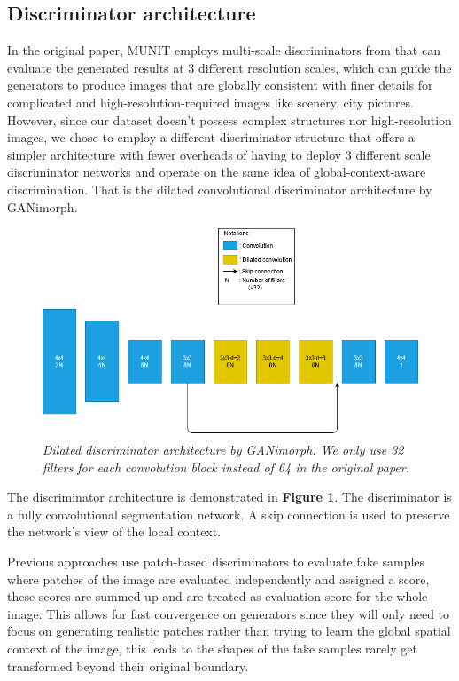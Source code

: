 \documentclass[12pt]{report}
\begin{document}
\subsection{Discriminator architecture}

In the original paper, MUNIT \cite{munit} employs multi-scale discriminators from \cite{multi-scale-discri} that can evaluate the generated results at 3 different resolution scales, which can guide the generators to produce images that are globally consistent with finer details for complicated and high-resolution-required images like scenery, city pictures. However, since our dataset doesn't possess complex structures nor high-resolution images, we chose to employ a different discriminator structure that offers a simpler architecture with fewer overheads of having to deploy 3 different scale discriminator networks and operate on the same idea of global-context-aware discrimination. That is the dilated convolutional discriminator architecture by GANimorph\cite{ganimorph}.

\begin{figure}[h]
	\centering
	\includegraphics[scale=0.6]{discri-architecture}
	\caption{\textit{Dilated discriminator architecture by GANimorph\cite{ganimorph}. We only use 32 filters for each convolution block instead of 64 in the original paper.}}
	\label{fig:discri-architecture}
\end{figure}

The discriminator architecture is demonstrated in \textbf{Figure \ref{fig:discri-architecture}}. The discriminator is a fully convolutional segmentation network. A skip connection is used to preserve the network's view of the local context.

Previous approaches \cite{cycle-gan}\cite{disco-gan} use patch-based discriminators to evaluate fake samples where patches of the image are evaluated independently and assigned a score, these scores are summed up and are treated as evaluation score for the whole image. This allows for fast convergence on generators since they will only need to focus on generating realistic patches rather than trying to learn the global spatial context of the image, this leads to the shapes of the fake samples rarely get transformed beyond their original boundary.
\end{document}
